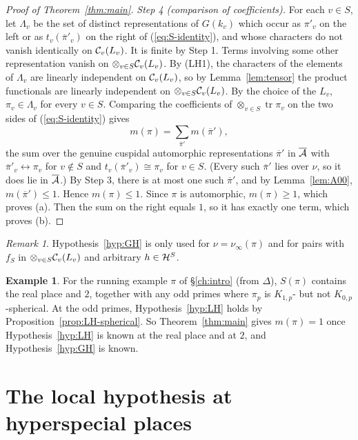 \documentclass[12pt,letterpaper]{book}
\theoremstyle{plain}
\theoremstyle{definition}
\newtheorem{example}[theorem]{Example}
\theoremstyle{remark}
\newtheorem{remark}[theorem]{Remark}
\theoremstyle{remark}
\newcommand{\tr}{\operatorname{tr}}
\begin{document}
\begin{proof}[Proof of Theorem~\ref{thm:main}]
{\em Step 4 (comparison of coefficients).} For each $v\in S$, let
$\Lambda_v$ be the set of distinct representations of $G(k_v)$ which
occur as $\pi'_v$ on the left or as $t_v(\overline{\pi}'_v)$ on the right
of (\ref{eq:S-identity}), and whose characters do not vanish identically
on ${\cal C}_v(L_v)$. It is finite by Step 1. Terms involving some other
representation vanish on $\otimes_{v\in S}{\cal C}_v(L_v)$. By (LH1), the
characters of the elements of $\Lambda_v$ are linearly independent on
${\cal C}_v(L_v)$, so by Lemma~\ref{lem:tensor} the product functionals
are linearly independent on $\otimes_{v\in S}{\cal C}_v(L_v)$. By the
choice of the $L_v$, $\pi_v\in\Lambda_v$ for every $v\in S$. Comparing
the coefficients of $\otimes_{v\in S}\tr \pi_v$ on the two sides of
(\ref{eq:S-identity}) gives
\[
m(\pi)=\sum_{\overline{\pi}'}m(\overline{\pi}'),
\]
the sum over the genuine cuspidal automorphic representations
$\overline{\pi}'$ in $\overline{\cal A}$ with
$\overline{\pi}'_v\leftrightarrow\pi_v$ for
$v\notin S$ and $t_v(\overline{\pi}'_v)\cong\pi_v$ for $v\in S$. (Every
such $\overline\pi'$ lies over $\nu$, so it does lie in $\overline{\cal A}$.)
By Step 3, there is at most one such $\overline{\pi}'$, and by
Lemma~\ref{lem:A00}, $m(\overline{\pi}')\leq 1$. Hence $m(\pi)\leq 1$.
Since $\pi$ is automorphic, $m(\pi)\geq 1$, which proves (a). Then the
sum on the right equals $1$, so it has exactly one term, which proves (b).
\end{proof}

\begin{remark}
Hypothesis~\ref{hyp:GH} is only used for $\nu=\nu_\infty(\pi)$ and for
pairs with $f_S$ in $\otimes_{v\in S}{\cal C}_v(L_v)$ and arbitrary
$h\in{\cal H}^S$.
\end{remark}

\begin{example}
For the running example $\pi$ of \S\ref{ch:intro} (from $\Delta$),
$S(\pi)$ contains the real place and $2$, together with any odd primes
where $\pi_p$ is $K_{1,p}$- but not $K_{0,p}$-spherical. At the odd primes,
Hypothesis~\ref{hyp:LH} holds by Proposition~\ref{prop:LH-spherical}. So
Theorem~\ref{thm:main} gives $m(\pi)=1$ once Hypothesis~\ref{hyp:LH} is
known at the real place and at $2$, and Hypothesis~\ref{hyp:GH} is known.
\end{example}

\section{The local hypothesis at hyperspecial places}
\end{document}
